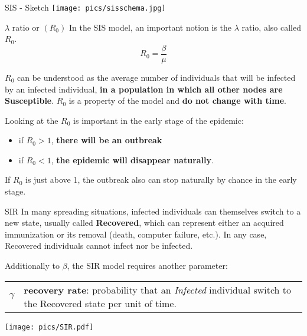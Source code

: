 \begin{textbox}{SIS - Sketch}
    \centering
    \texttt{[image: pics/sisschema.jpg]}
\end{textbox}


\begin{textbox}{$\lambda$ ratio or $(R_0)$}
    In the SIS model, an important notion is the $\lambda$ ratio, also called $R_0$.
    \[
        R_0=\frac{\beta}{\mu}
    \]

    $R_0$ can be understood as the average number of individuals that will be infected by an infected individual, \textbf{in a population in which all other nodes are Susceptible}. $R_0$ is a property of the model and \textbf{do not change with time}.

    Looking at the $R_0$ is important in the early stage of the epidemic:
    \begin{itemize}
        \item if $R_0>1$, \textbf{there will be an outbreak}
        \item if $R_0<1$, \textbf{the epidemic will disappear naturally}.
    \end{itemize}

    If $R_0$ is just above 1, the outbreak also can stop naturally by chance in the early stage.
\end{textbox}


\begin{textbox}{SIR}
    In many spreading situations, infected individuals can themselves switch to a new state, usually called \textbf{Recovered}, which can represent either an acquired immunization or its removal (death, computer failure, etc.). In any case, Recovered individuals cannot infect nor be infected.

    Additionally to $\beta$, the SIR model requires another parameter:

    \begin{tabular}{p{}|p{}}\scriptsize

        $\gamma$ & \textbf{recovery rate}: probability that an \textit{Infected} individual switch to the Recovered state per unit of time.
    \end{tabular}
    \centering
    \vspace{0.3cm}
    \texttt{[image: pics/SIR.pdf]}
\end{textbox}


